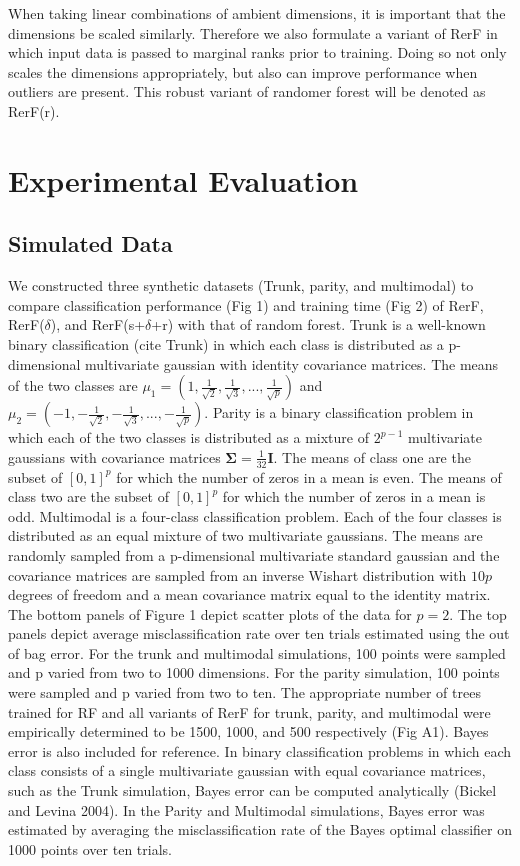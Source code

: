 \documentclass{article} %
\begin{document}
When taking linear combinations of ambient dimensions, it is important that the dimensions be scaled similarly. Therefore we also formulate a variant of RerF in which input data is passed to marginal ranks prior to training. Doing so not only scales the dimensions appropriately, but also can improve performance when outliers are present. This robust variant of randomer forest will be denoted as RerF(r).

\section{Experimental Evaluation}

\subsection{Simulated Data}
We constructed three synthetic datasets (Trunk, parity, and multimodal) to compare classification performance (Fig 1) and training time (Fig 2) of RerF, RerF($\delta$), and RerF(s+$\delta$+r) with that of random forest. Trunk is a well-known binary classification (cite Trunk) in which each class is distributed as a p-dimensional multivariate gaussian with identity covariance matrices. The means of the two classes are $\mu_1 = (1,\frac{1}{\sqrt{2}},\frac{1}{\sqrt{3}},...,\frac{1}{\sqrt{p}})$ and $\mu_2 = (-1,-\frac{1}{\sqrt{2}},-\frac{1}{\sqrt{3}},...,-\frac{1}{\sqrt{p}})$. Parity is a binary classification problem in which each of the two classes is distributed as a mixture of $2^{p-1}$ multivariate gaussians with covariance matrices $\boldsymbol{\Sigma} = \frac{1}{32}\boldsymbol{I}$. The means of class one are the subset of $[0,1]^p$ for which the number of zeros in a mean is even. The means of class two are the subset of $[0,1]^p$ for which the number of zeros in a mean is odd. Multimodal is a four-class classification problem. Each of the four classes is distributed as an equal mixture of two multivariate gaussians. The means are randomly sampled from a p-dimensional multivariate standard gaussian and the covariance matrices are sampled from an inverse Wishart distribution with $10p$ degrees of freedom and  a mean covariance matrix equal to the identity matrix. The bottom panels of Figure 1 depict scatter plots of the data for $p=2$. The top panels depict average misclassification rate over ten trials estimated using the out of bag error. For the trunk and multimodal simulations, 100 points were sampled and p varied from two to 1000 dimensions. For the parity simulation, 100 points were sampled and p varied from two to ten. The appropriate number of trees trained for RF and all variants of RerF for trunk, parity, and multimodal were empirically determined to be 1500, 1000, and 500 respectively (Fig A1). Bayes error is also included for reference. In binary classification problems in which each class consists of a single multivariate gaussian with equal covariance matrices, such as the Trunk simulation, Bayes error can be computed analytically (Bickel and Levina 2004). In the Parity and Multimodal simulations, Bayes error was estimated by averaging the misclassification rate of the Bayes optimal classifier on 1000 points over ten trials.
\end{document}

